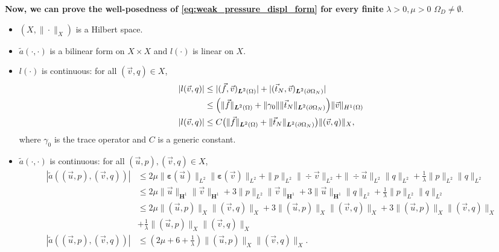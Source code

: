 \documentclass[a4paper,12pt,twoside]{report}
\begin{document}
\noindent \textbf{Now, we can prove the well-posedness of \eqref{eq:weak_pressure_displ_form} for every finite }$\lambda>0, \mu>0$  $\Omega_D \neq \emptyset$.
\begin{itemize}
	\item $(X,\|\cdot\|_X)$ is a Hilbert space.
	\item $\tilde a(\cdot,\cdot)$ is a bilinear form on $X\times X$ and $l(\cdot)$ is linear on $X$.
	\item $l(\cdot)$ is continuous: for all $(\vec v,q)\in X$,
	\begin{equation*}
		\begin{aligned}
			|l(\vec v,q)|
			&\le |(\vec f,\vec v)_{\boldsymbol L^2(\Omega)}| + |(\vec t_N,\vec v)_{\boldsymbol L^2(\partial\Omega_N)}| \\
			&\le \Big(\|\vec f\|_{\boldsymbol L^2(\Omega)} + \norm{\gamma_0} \|\vec t_N\|_{\boldsymbol L^2(\partial\Omega_N)}\Big)\|\vec v\|_{H^1(\Omega)} \\
			|l(\vec v,q)| &\le C \big(\|\vec f\|_{\boldsymbol L^2(\Omega)} + \|\vec t_N\|_{\boldsymbol L^2(\partial\Omega_N)}\big)\|(\vec v,q)\|_X,
		\end{aligned}
	\end{equation*}
	where $\gamma_0$ is the trace operator and $C$ is a generic constant.
	\item $\tilde a(\cdot,\cdot)$ is continuous: for all $(\vec u,p),(\vec v,q)\in X$,
	\begin{equation*}
		\begin{aligned}
			|\tilde a((\vec u,p),(\vec v,q))|
			&\le 2\mu \|\boldsymbol{\varepsilon}(\vec u)\|_{L^2}\|\boldsymbol{\varepsilon}(\vec v)\|_{L^2}
				+ \|p\|_{L^2}\|\div \vec v\|_{L^2}
				+ \|\div \vec u\|_{L^2}\|q\|_{L^2}
				+ \tfrac{1}{\lambda}\|p\|_{L^2}\|q\|_{L^2} \\
			&\le 2 \mu \|\vec u\|_{\boldsymbol H^1}\|\vec v\|_{\boldsymbol H^1}
				+ 3 \|p\|_{L^2}\|\vec v\|_{\boldsymbol H^1}
				+ 3 \|\vec u\|_{\boldsymbol H^1}\|q\|_{L^2}
				+ \frac{1}{\lambda}\|p\|_{L^2}\|q\|_{L^2} \\
			&\le 2 \mu \| (\vec u,p)\|_X \|(\vec v,q)\|_X
				+ 3 \|(\vec u,p)\|_X \|(\vec v,q)\|_X
				+ 3 \|(\vec u,p)\|_X \|(\vec v,q)\|_X \\
				& + \frac{1}{\lambda}\|(\vec u,p)\|_X \|(\vec v,q)\|_X \\
			|\tilde a((\vec u,p),(\vec v,q))| &\le (2\mu + 6 + \frac{1}{\lambda})\|(\vec u,p)\|_X \|(\vec v,q)\|_X.
		\end{aligned}
	\end{equation*}

\end{itemize}
\end{document}
